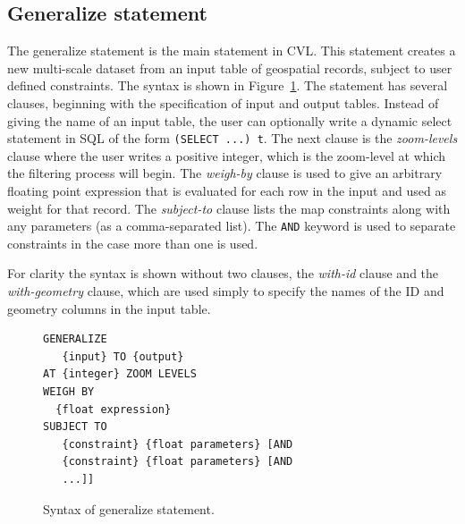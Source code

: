 \subsection{Generalize statement}
\label{sec:generalize:statement}

The generalize statement is the main statement in CVL. This statement creates a new multi-scale dataset from an input table of geospatial records, subject to user defined constraints. The syntax is shown in Figure~\ref{fig:generalize:syntax}. The statement has several clauses, beginning with the specification of input and output tables. Instead of giving the name of an input table, the user can optionally write a dynamic select statement in SQL of the form \texttt{(SELECT ...) t}. The next clause is the \emph{zoom-levels} clause where the user writes a positive integer, which is the zoom-level  at which the filtering process will begin. The \emph{weigh-by} clause is used to give an arbitrary floating point expression that is evaluated for each row in the input and used as weight for that record. The \emph{subject-to} clause lists the map constraints along with any parameters (as a comma-separated list). The \texttt{AND} keyword is used to separate constraints in the case more than one is used.

For clarity the syntax is shown without two clauses, the \emph{with-id} clause and the \emph{with-geometry} clause, which are used simply to specify the names of the ID and geometry columns in the input table.

\begin{figure}[htbp]
\begin{center}
\begin{lstlisting}
GENERALIZE 
   {input} TO {output}
AT {integer} ZOOM LEVELS
WEIGH BY
  {float expression}
SUBJECT TO 
   {constraint} {float parameters} [AND
   {constraint} {float parameters} [AND
   ...]]
\end{lstlisting}
\caption{Syntax of generalize statement.}
\label{fig:generalize:syntax}
\end{center}
\end{figure}

